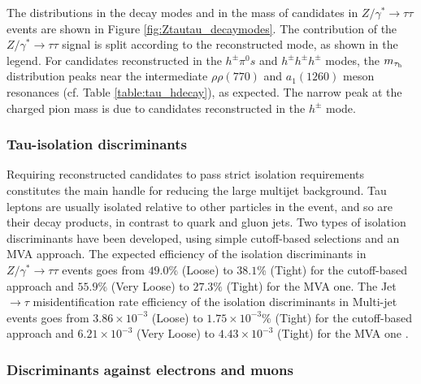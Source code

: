 The distributions in the decay modes and in the mass of \hadtau candidates in \ensuremath{Z/\gamma^{*} \longrightarrow \tau\tau} events are shown in Figure \ref{fig:Ztautau_decaymodes}. The contribution of the \ensuremath{Z/\gamma^{*} \longrightarrow \tau\tau} signal is split according to the reconstructed \hadtau mode, as shown in the legend. For \hadtau candidates reconstructed in the \ensuremath{h^{\pm}\pi^{0}s} and \ensuremath{h^{\pm}h^{\pm}h^{\pm}} modes, the \ensuremath{m_{\hadtau}} distribution peaks near the intermediate \ensuremath{ρ\rho(770)} and \ensuremath{a_{1}(1260)} meson resonances (cf. Table \ref{table:tau_hdecay}), as expected. The narrow peak at the charged pion mass is due to \hadtau candidates reconstructed in the \ensuremath{h^{\pm}} mode.

\subsubsection{Tau-isolation discriminants}

Requiring reconstructed \hadtau candidates to pass strict isolation requirements constitutes the main handle for reducing the large multijet background. Tau leptons are usually isolated relative to other particles in the event, and so are their decay products, in contrast to quark and gluon jets. Two types of \hadtau isolation discriminants have been developed, using simple cutoff-based selections and an MVA approach. The expected efficiency of the \hadtau isolation discriminants in \ensuremath{Z/\gamma^{*} \longrightarrow \tau\tau} events goes from \ensuremath{49.0\%} (Loose) to \ensuremath{38.1}\% (Tight) for the cutoff-based approach and \ensuremath{55.9\%} (Very Loose) to \ensuremath{27.3\%} (Tight) for the MVA one. The Jet \ensuremath{\to \tau} misidentification rate efficiency of the \hadtau isolation discriminants in Multi-jet events goes from \ensuremath{3.86 \times 10^{−3}} (Loose) to \ensuremath{1.75 \times 10^{−3}}\% (Tight) for the cutoff-based approach and \ensuremath{6.21 \times 10^{−3}} (Very Loose) to \ensuremath{4.43 \times 10^{−3}} (Tight) for the MVA one \cite{Khachatryan:2015dfa}.
 
\subsubsection{Discriminants against electrons and muons}

